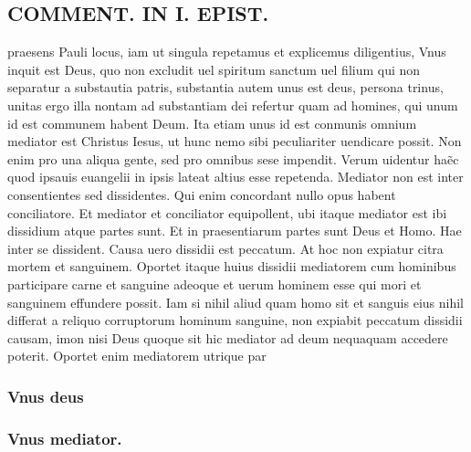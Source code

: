 \documentclass{article}
\begin{document}
\begin{pages}
\section*{COMMENT. IN I. EPIST. }\pstart praesens Pauli locus, iam ut singula repetamus et explicemus diligentius, Vnus inquit est Deus, quo non excludit uel spiritum sanctum uel filium qui non separatur a substautia patris, substantia autem unus est deus, persona trinus, unitas ergo illa nontam ad substantiam dei refertur quam ad homines, qui unum id est communem habent Deum. Ita etiam unus id est conmunis omnium mediator est Christus Iesus, ut hunc nemo sibi peculiariter uendicare possit. Non enim pro una aliqua gente, sed pro omnibus sese impendit. Verum uidentur haẽc quod ipsauis euangelii in ipsis lateat altius esse repetenda. Mediator non est inter consentientes sed dissidentes. Qui enim concordant nullo opus habent conciliatore. Et mediator et conciliator equipollent, ubi itaque mediator est ibi dissidium atque partes sunt. Et in praesentiarum partes sunt Deus et Homo. Hae inter se dissident. Causa uero dissidii est peccatum. At hoc non expiatur citra mortem et sanguinem. Oportet itaque huius dissidii mediatorem cum hominibus participare carne et sanguine adeoque et uerum hominem esse qui mori et sanguinem effundere possit. Iam si nihil aliud quam homo sit et sanguis eius nihil differat a reliquo corruptorum hominum sanguine, non expiabit peccatum dissidii causam, imon nisi Deus quoque sit hic mediator ad deum nequaquam accedere poterit. Oportet enim mediatorem utrique par\pend
\subsubsection*{Vnus deus }
\subsubsection*{Vnus mediator. }

\end{pages}
\end{document}
